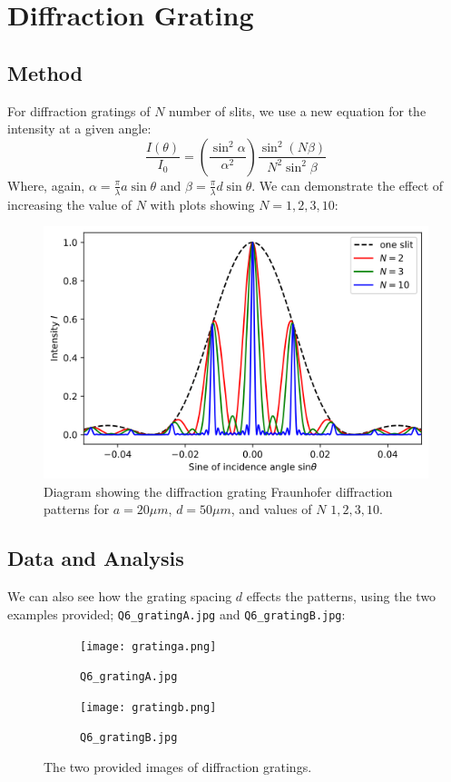 \documentclass[a4paper]{article}
\begin{document}
\section{Diffraction Grating}
\subsection{Method}

For diffraction gratings of $N$ number of slits, we use a new equation for the intensity at a given angle:
\begin{equation}
\frac{I(\theta)}{I_0}=\left(\frac{\sin^2\alpha}{\alpha^2}\right)\frac{\sin^2(N\beta)}{N^2\sin^2\beta}
\end{equation}
Where, again, $\alpha=\frac\pi\lambda a\sin\theta$ and $\beta=\frac\pi\lambda d\sin\theta$. We can demonstrate the effect of increasing the value of $N$ with plots showing $N=1, 2, 3, 10$:
\begin{figure}[h!]
\centerline{\includegraphics[scale=0.7]{grating.png}}
\caption{Diagram showing the diffraction grating Fraunhofer diffraction patterns for $a=20\mu m$, $d=50 \mu m$, and values of $N$ $1, 2, 3, 10$.}
\label{fig:gratingdemo}
\end{figure}
\newpage
\subsection{Data and Analysis}
We can also see how the grating spacing $d$ effects the patterns, using the two examples provided; {\lstinline$Q6_gratingA.jpg$} and {\lstinline$Q6_gratingB.jpg$}:

\begin{figure}[h!]
\centering
\begin{subfigure}{.5\textwidth}
	\centering
	\centerline{\texttt{[image: gratinga.png]}}
	\caption{{\lstinline$Q6_gratingA.jpg$}}
\end{subfigure}%
\begin{subfigure}{.5\textwidth}
	\centering
	\centerline{\texttt{[image: gratingb.png]}}
	\caption{{\lstinline$Q6_gratingB.jpg$}}
\end{subfigure}
\label{fig:gratings}
\caption{The two provided images of diffraction gratings.}
\end{figure}
\end{document}
